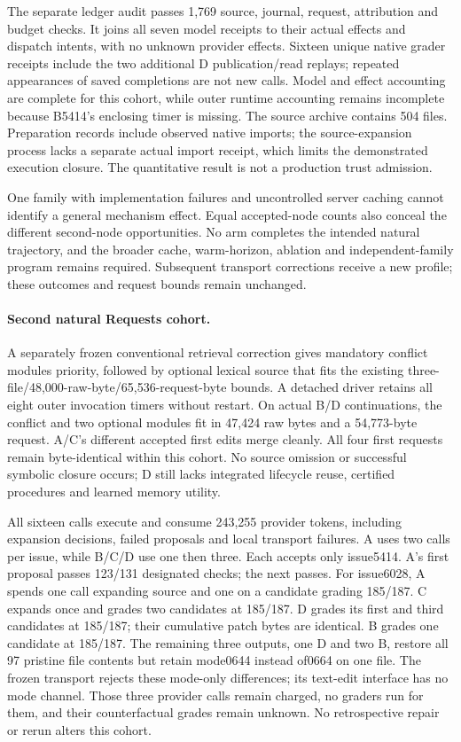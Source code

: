 The separate ledger audit passes 1,769 source, journal, request, attribution and
budget checks. It joins all seven model receipts to their actual effects and
dispatch intents, with no unknown provider effects. Sixteen unique native
grader receipts include the two additional D publication/read replays; repeated
appearances of saved completions are not new calls. Model and effect accounting
are complete for this cohort, while outer runtime accounting remains incomplete
because B5414's enclosing timer is missing. The source archive contains 504
files. Preparation records include observed native imports; the source-expansion
process lacks a separate actual import receipt, which limits the demonstrated
execution closure. The quantitative result is not a production trust admission.

One family with implementation failures and uncontrolled server caching cannot
identify a general mechanism effect. Equal accepted-node counts also conceal
the different second-node opportunities. No arm completes the intended natural
trajectory, and the broader cache, warm-horizon, ablation and independent-family
program remains required. Subsequent transport corrections receive a new profile;
these outcomes and request bounds remain unchanged.

\paragraph{Second natural Requests cohort.}
A separately frozen conventional retrieval correction gives mandatory conflict
modules priority, followed by optional lexical source that fits the existing
three-file/48,000-raw-byte/65,536-request-byte bounds. A detached driver retains
all eight outer invocation timers without restart. On actual B/D continuations,
the conflict and two optional modules fit in 47,424 raw bytes and a 54,773-byte
request. A/C's different accepted first edits merge cleanly. All four first
requests remain byte-identical within this cohort. No source omission or
successful symbolic closure occurs; D still lacks integrated lifecycle reuse,
certified procedures and learned memory utility.

All sixteen calls execute and consume 243,255 provider tokens, including
expansion decisions, failed proposals and local transport failures. A uses
two calls per issue, while B/C/D use one then three. Each accepts only issue5414.
A's first proposal passes 123/131 designated checks; the next passes. For
issue6028, A spends one call expanding source and one on a candidate grading
185/187. C expands once and grades two candidates at 185/187. D grades its
first and third candidates at 185/187; their cumulative patch bytes are
identical. B grades one candidate at 185/187. The remaining three outputs,
one D and two B, restore all 97 pristine file contents but retain mode0644
instead of0664 on one file. The frozen transport rejects these mode-only
differences; its text-edit interface has no mode channel. Those three provider
calls remain charged, no graders run for them, and their counterfactual grades
remain unknown. No retrospective repair or rerun alters this cohort.

